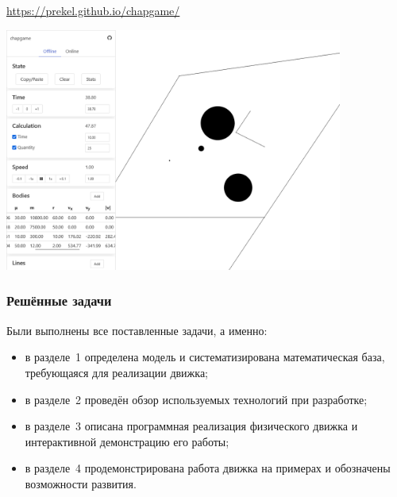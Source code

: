\documentclass[xetex,aspectratio=43]{beamer}
\begin{document}
\begin{frame}
    {\color{blue}\url{https://prekel.github.io/chapgame/}}

    \includegraphics[height=8cm]{chapgame_2}

\end{frame}

\begin{frame}
    \frametitle{Решённые задачи}

    Были выполнены все поставленные задачи, а именно:

    \begin{itemize}
        \item в разделе~1 определена модель и систематизирована математическая база, требующаяся для реализации движка;
        \item в разделе~2 проведён обзор используемых технологий при разработке;
        \item в разделе~3 описана программная реализация физического движка и интерактивной демонстрацию его работы;
        \item в разделе~4 продемонстрирована работа движка на примерах и обозначены возможности развития.
    \end{itemize}
\end{frame}

\begin{frame}
    \titlepage
\end{frame}
\end{document}
